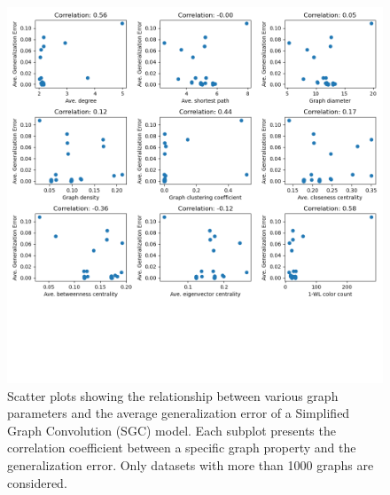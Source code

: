 \begin{figure}[H]
    \centering
    \includegraphics[scale=0.6]{images/correlation_ignore_less_than_1000_SGC.png}
    \caption{Scatter plots showing the relationship between various graph parameters and the average generalization error of a Simplified Graph Convolution (SGC) model. Each subplot presents the correlation coefficient between a specific graph property and the generalization error. Only datasets with more than 1000 graphs are considered.}
    \label{fig:correlation_ignore_less_than_1000_SGC}
\end{figure}